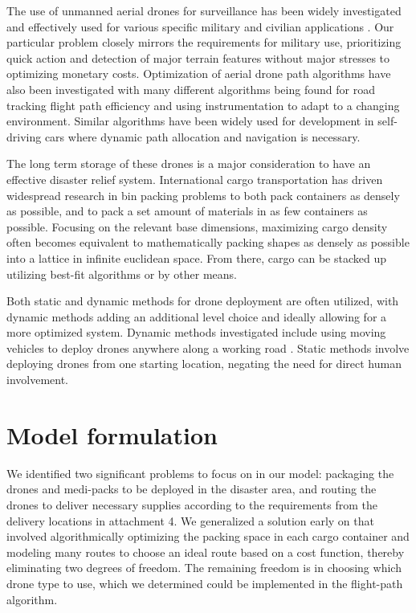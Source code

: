 \documentclass[twocolumn,10pt]{asme2ej}
\begin{document}
The use of unmanned aerial drones for surveillance has been widely investigated and effectively used for various specific military and civilian applications \cite{Otto}\cite{Arribas}. Our particular problem closely mirrors the requirements for military use, prioritizing quick action and detection of major terrain features without major stresses to optimizing monetary costs. Optimization of aerial drone path algorithms have also been investigated with many different algorithms being found for road tracking \cite{Baumgartner} flight path efficiency \cite{EscribianoMacias} and using instrumentation to adapt to a changing environment. Similar algorithms have been widely used for development in self-driving cars where dynamic path allocation and navigation is necessary.

The long term storage of these drones is a major consideration to have an effective disaster relief system. International cargo transportation has driven widespread research in bin packing problems to both pack containers as densely as possible, and to pack a set amount of materials in as few containers as possible. Focusing on the relevant base dimensions, maximizing cargo density often becomes equivalent to mathematically packing shapes as densely as possible into a lattice in infinite euclidean space. From there, cargo can be stacked up utilizing best-fit algorithms or by other means. \cite{Lin}

Both static and dynamic methods for drone deployment are often utilized, with dynamic methods adding an additional level choice and ideally allowing for a more optimized system. Dynamic methods investigated include using moving vehicles to deploy drones anywhere along a working road \cite{Scott}. Static methods involve deploying drones from one starting location, negating the need for direct human involvement.

\section{Model formulation}
We identified two significant problems to focus on in our model: packaging the drones and medi-packs to be deployed in the disaster area, and routing the drones to deliver necessary supplies according to the requirements from the delivery locations in attachment 4. We generalized a solution early on that involved algorithmically optimizing the packing space in each cargo container and modeling many routes to choose an ideal route based on a cost function, thereby eliminating two degrees of freedom. The remaining freedom is in choosing which drone type to use, which we determined could be implemented in the flight-path algorithm.
\end{document}
